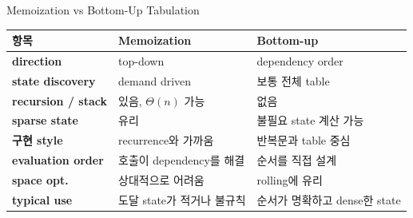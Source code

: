 \begin{frame}{Memoization vs Bottom-Up Tabulation}
\small\centering
\renewcommand{\arraystretch}{1.24}
\setlength{\tabcolsep}{4pt}
\begin{tabular}{>{\bfseries}p{}p{}p{}}\toprule
항목&Memoization&Bottom-up\\\midrule
direction&top-down&dependency order\\
state discovery&demand driven&보통 전체 table\\
recursion / stack&있음, $\Theta(n)$ 가능&없음\\
sparse state&유리&불필요 state 계산 가능\\
구현 style&recurrence와 가까움&반복문과 table 중심\\
evaluation order&호출이 dependency를 해결&순서를 직접 설계\\
space opt.&상대적으로 어려움&rolling에 유리\\
typical use&도달 state가 적거나 불규칙&순서가 명확하고 dense한 state\\\bottomrule
\end{tabular}
\vfill{}
\end{frame}
